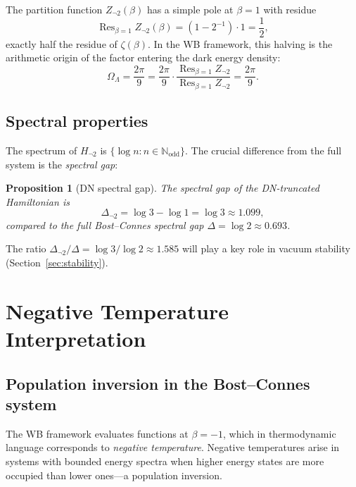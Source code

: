 \documentclass[12pt,a4paper]{article}
\newtheorem{proposition}[theorem]{Proposition}
\newcommand{\Res}{\operatorname{Res}}
\newcommand{\OL}{\Omega_\Lambda}
\begin{document}
The partition function $Z_{\neg 2}(\beta)$ has a simple pole at $\beta = 1$ with residue
\begin{equation}\label{eq:DN-residue}
  \Res_{\beta=1} Z_{\neg 2}(\beta) = (1-2^{-1}) \cdot 1 = \frac{1}{2},
\end{equation}
exactly half the residue of $\zeta(\beta)$. In the WB framework, this halving is the arithmetic origin of the factor entering the dark energy density:
\begin{equation}
  \OL = \frac{2\pi}{9} = \frac{2\pi}{9} \cdot \frac{\Res_{\beta=1} Z_{\neg 2}}{\Res_{\beta=1} Z_{\neg 2}} = \frac{2\pi}{9}.
\end{equation}

\subsection{Spectral properties}

The spectrum of $H_{\neg 2}$ is $\{\log n : n \in \mathbb{N}_{\mathrm{odd}}\}$. The crucial difference from the full system is the \emph{spectral gap}:

\begin{proposition}[DN spectral gap]\label{prop:gap}
The spectral gap of the DN-truncated Hamiltonian is
\begin{equation}
  \Delta_{\neg 2} = \log 3 - \log 1 = \log 3 \approx 1.099,
\end{equation}
compared to the full Bost--Connes spectral gap $\Delta = \log 2 \approx 0.693$.
\end{proposition}

The ratio $\Delta_{\neg 2}/\Delta = \log 3/\log 2 \approx 1.585$ will play a key role in vacuum stability (Section~\ref{sec:stability}).

\section{Negative Temperature Interpretation}
\label{sec:neg-temp}

\subsection{Population inversion in the Bost--Connes system}

The WB framework evaluates functions at $\beta = -1$, which in thermodynamic language corresponds to \emph{negative temperature}. Negative temperatures arise in systems with bounded energy spectra when higher energy states are more occupied than lower ones---a population inversion.
\end{document}
